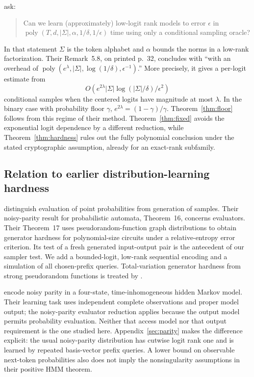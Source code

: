 \documentclass[11pt]{article}
\newcommand{\poly}{\operatorname{poly}}
\theoremstyle{definition}
\theoremstyle{remark}
\begin{document}
\citet[Problem~6.2, printed p.~34]{gls2} ask:
\begin{quote}
Can we learn (approximately) low-logit rank models to error $\epsilon$ in $\poly(T,d,|\Sigma|,\alpha,1/\delta,1/\epsilon)$ time using only a conditional sampling oracle?
\end{quote}
In that statement $\Sigma$ is the token alphabet and $\alpha$ bounds the norms in a low-rank factorization. Their Remark~5.8, on printed p.~32, concludes with ``with an overhead of $\poly(e^{\lambda},|\Sigma|,\log(1/\delta),\epsilon^{-1})$.'' More precisely, it gives a per-logit estimate from
\[
O\!\left(e^{2\lambda}|\Sigma|\log(|\Sigma|/\delta)/\epsilon^2\right)
\]
conditional samples when the centered logits have magnitude at most $\lambda$. In the binary case with probability floor $\gamma$, $e^{2\lambda}=(1-\gamma)/\gamma$. Theorem~\ref{thm:floor} follows from this regime of their method. Theorem~\ref{thm:fixed} avoids the exponential logit dependence by a different reduction, while Theorem~\ref{thm:hardness} rules out the fully polynomial conclusion under the stated cryptographic assumption, already for an exact-rank subfamily.

\subsection{Relation to earlier distribution-learning hardness}

\citet{kmrrss} distinguish evaluation of point probabilities from generation of samples. Their noisy-parity result for probabilistic automata, Theorem~16, concerns evaluators. Their Theorem~17 uses pseudorandom-function graph distributions to obtain generator hardness for polynomial-size circuits under a relative-entropy error criterion. Its test of a fresh generated input-output pair is the antecedent of our sampler test. We add a bounded-logit, low-rank sequential encoding and a simulation of all chosen-prefix queries. Total-variation generator hardness from strong pseudorandom functions is treated by \citet{sweke}.

\citet[Section~1.3]{mossel-roch} encode noisy parity in a four-state, time-inhomogeneous hidden Markov model. Their learning task uses independent complete observations and proper model output; the noisy-parity evaluator reduction applies because the output model permits probability evaluation. Neither that access model nor that output requirement is the one studied here. Appendix~\ref{sec:parity} makes the difference explicit: the usual noisy-parity distribution has cutwise logit rank one and is learned by repeated basis-vector prefix queries. A lower bound on observable next-token probabilities also does not imply the nonsingularity assumptions in their positive HMM theorem.
\end{document}
